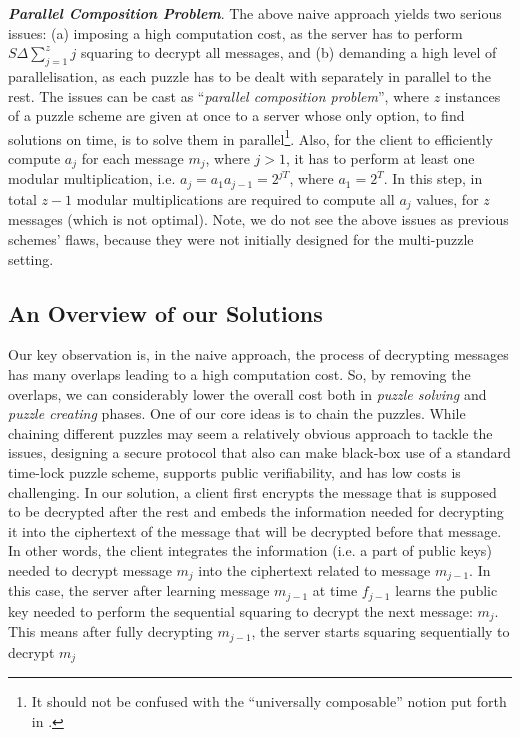 \noindent\textit{\textbf{Parallel Composition Problem}}. The above naive approach yields two serious issues: (a) imposing a high computation cost, as  the server has to perform $S\Delta \sum\limits_{\scriptscriptstyle j=1}^{\scriptscriptstyle z}j$ squaring to decrypt all   messages, and (b) demanding a high level of parallelisation, as each puzzle has to be dealt with separately in parallel to the rest.  The  issues can be cast  as  ``\emph{parallel composition problem}'', where $z$ instances of a puzzle scheme are given at once to a server whose only option, to find solutions on time, is to solve them in parallel\footnote{It should not be confused with the ``universally composable'' notion put forth in \cite{Canetti01}.}. Also, for the client  to efficiently compute $a_{\scriptscriptstyle j}$  for each  message $m_{\scriptscriptstyle j}$,  where $j>1$, it has to perform at least one modular multiplication, i.e. $a_{\scriptscriptstyle j}=a_{\scriptscriptstyle 1} a_{\scriptscriptstyle j-1}=2^{\scriptscriptstyle j  T}$, where $a_{\scriptscriptstyle 1}=2^{\scriptscriptstyle T}$. In this step, in total $z-1$ modular multiplications are required  to compute all $a_{\scriptscriptstyle j}$ values, for $z$ messages (which is not optimal). Note, we do not see the above issues as  previous schemes' flaws, because they were not initially designed for the multi-puzzle setting.  
 
\vspace{-3mm}

%

 \subsection{An Overview of our Solutions}\label{Overview-of-our-Solutions}
 Our key observation is, in the naive approach, the process of decrypting  messages has many overlaps  leading to a high  computation cost. So,  by removing the overlaps, we can considerably lower the overall cost both in \emph{puzzle solving} and \emph{puzzle creating} phases.  One of our core ideas  is to chain the puzzles. While chaining different puzzles may seem a relatively obvious approach to tackle the  issues, designing a secure protocol that also can make black-box use of a standard time-lock puzzle scheme, supports public verifiability, and has low costs is challenging. In our solution, a client  first encrypts the message  that is supposed to be decrypted after the rest and embeds the information needed for decrypting it into the ciphertext of the message that will be decrypted before that message. In other words, the client integrates the information (i.e. a part of public keys) needed to decrypt message $m_{\scriptscriptstyle j}$ into the ciphertext related to message $m_{\scriptscriptstyle j-1}$. In this case, the server after learning message $m_{\scriptscriptstyle j-1}$ at time $f_{\scriptscriptstyle j-1}$ learns the public key needed to perform the sequential squaring to decrypt the next message: $m_{\scriptscriptstyle j}$. This means after fully decrypting $m_{\scriptscriptstyle j-1}$, the server starts  squaring sequentially to decrypt $m_{\scriptscriptstyle j}$
  
